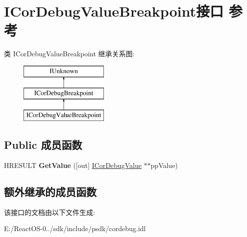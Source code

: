 \hypertarget{interface_i_cor_debug_value_breakpoint}{}\section{I\+Cor\+Debug\+Value\+Breakpoint接口 参考}
\label{interface_i_cor_debug_value_breakpoint}
类 I\+Cor\+Debug\+Value\+Breakpoint 继承关系图\+:\begin{figure}[H]
\begin{center}
\leavevmode
\includegraphics[height=3.000000cm]{interface_i_cor_debug_value_breakpoint}
\end{center}
\end{figure}
\subsection*{Public 成员函数}
\begin{DoxyCompactItemize}
\item 
\mbox{\label{interface_i_cor_debug_value_breakpoint_a892a49b14a30deba9fb695e91e4ab304}} 
H\+R\+E\+S\+U\+LT {\bfseries Get\+Value} (\mbox{[}out\mbox{]} \hyperlink{interface_i_cor_debug_value}{I\+Cor\+Debug\+Value} $\ast$$\ast$pp\+Value)
\end{DoxyCompactItemize}
\subsection*{额外继承的成员函数}


该接口的文档由以下文件生成\+:\begin{DoxyCompactItemize}
\item 
E\+:/\+React\+O\+S-\/0../sdk/include/psdk/cordebug.\+idl\end{DoxyCompactItemize}
